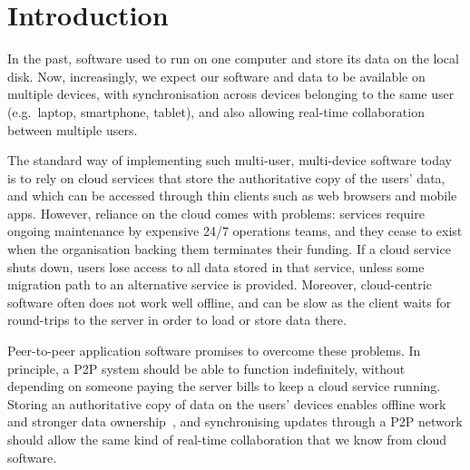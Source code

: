 \documentclass[sigplan,10pt]{acmart}
\begin{document}


\maketitle

\section{Introduction}

In the past, software used to run on one computer and store its data on the local disk.
Now, increasingly, we expect our software and data to be available on multiple devices, with synchronisation across devices belonging to the same user (e.g.\ laptop, smartphone, tablet), and also allowing real-time collaboration between multiple users.

The standard way of implementing such multi-user, multi-device software today is to rely on cloud services that store the authoritative copy of the users' data, and which can be accessed through thin clients such as web browsers and mobile apps.
However, reliance on the cloud comes with problems: services require ongoing maintenance by expensive 24/7 operations teams, and they cease to exist when the organisation backing them terminates their funding.
If a cloud service shuts down, users lose access to all data stored in that service, unless some migration path to an alternative service is provided.
Moreover, cloud-centric software often does not work well offline, and can be slow as the client waits for round-trips to the server in order to load or store data there.

Peer-to-peer application software promises to overcome these problems.
In principle, a P2P system should be able to function indefinitely, without depending on someone paying the server bills to keep a cloud service running.
Storing an authoritative copy of data on the users' devices enables offline work and stronger data ownership~\cite{LocalFirst}, and synchronising updates through a P2P network should allow the same kind of real-time collaboration that we know from cloud software.
\end{document}
